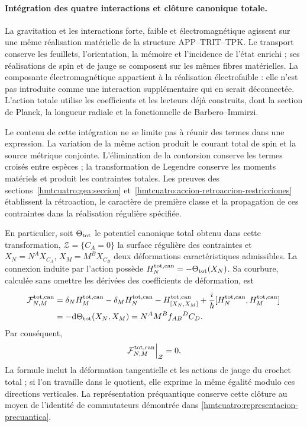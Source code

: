 \paragraph{Intégration des quatre interactions et clôture canonique totale.}
La gravitation et les interactions forte, faible et électromagnétique agissent sur une même réalisation matérielle de la structure APP--TRIT--TPK. Le transport conserve les feuillets, l’orientation, la mémoire et l’incidence de l’état enrichi ; ses réalisations de spin et de jauge se composent sur les mêmes fibres matérielles. La composante électromagnétique appartient à la réalisation électrofaible : elle n’est pas introduite comme une interaction supplémentaire qui en serait déconnectée. L’action totale utilise les coefficients et les lecteurs déjà construits, dont la section de Planck, la longueur radiale et la fonctionnelle de Barbero--Immirzi.

Le contenu de cette intégration ne se limite pas à réunir des termes dans une expression. La variation de la même action produit le courant total de spin et la source métrique conjointe. L’élimination de la contorsion conserve les termes croisés entre espèces ; la transformation de Legendre conserve les moments matériels et produit les contraintes totales. Les preuves des sections~\ref{hmtcuatro:gea:seccion} et~\ref{hmtcuatro:accion-retroaccion-restricciones} établissent la rétroaction, le caractère de première classe et la propagation de ces contraintes dans la réalisation régulière spécifiée.

En particulier, soit $\Theta_{\rm tot}$ le potentiel canonique total obtenu dans cette transformation, $\mathcal Z=\{C_A=0\}$ la surface régulière des contraintes et $X_N=N^AX_{C_A}$, $X_M=M^BX_{C_B}$ deux déformations caractéristiques admissibles. La connexion induite par l’action possède $H_N^{\rm tot,can}=-\Theta_{\rm tot}(X_N)$. Sa courbure, calculée sans omettre les dérivées des coefficients de déformation, est
\begin{equation}
\begin{aligned}
\mathcal F^{\rm tot,can}_{N,M}
&=\delta_NH_M^{\rm tot,can}-\delta_MH_N^{\rm tot,can}
 -H_{[X_N,X_M]}^{\rm tot,can}
 +\frac{i}{\hbar}[H_N^{\rm tot,can},H_M^{\rm tot,can}]\\
&=-\mathrm d\Theta_{\rm tot}(X_N,X_M)
 =N^AM^B f_{AB}{}^{D}C_D.
\end{aligned}
\label{hmtcuatro:conclusion-curvatura-total}
\end{equation}
Par conséquent,
\[
 \left.\mathcal F^{\rm tot,can}_{N,M}\right|_{\mathcal Z}=0.
\]
La formule inclut la déformation tangentielle et les actions de jauge du crochet total ; si l’on travaille dans le quotient, elle exprime la même égalité modulo ces directions verticales. La représentation préquantique conserve cette clôture au moyen de l’identité de commutateurs démontrée dans \eqref{hmtcuatro:representacion-precuantica}.

